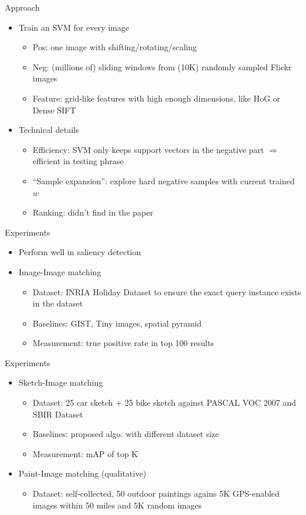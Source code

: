 \documentclass[12pt]{beamer}
\begin{document}
\begin{frame}{Approach}
	\begin{itemize}
		\item Train an SVM for every image
		\begin{itemize}
			\item Pos: one image with shifting/rotating/scaling
			\item Neg: (millions of) sliding windows from (10K) randomly sampled Flickr images
			\item Feature: grid-like features with high enough dimensions, like HoG or Dense SIFT
		\end{itemize}
		\item Technical details
		\begin{itemize}
			\item Efficiency: SVM only keeps support vectors in the negative part $\Rightarrow$ efficient in testing phrase
			\item ``Sample expansion'': explore hard negative samples with current trained $w$
			\item Ranking: didn't find in the paper
		\end{itemize}
	\end{itemize}
\end{frame}

\begin{frame}{Experiments}
	\begin{itemize}
		\item Perform well in saliency detection
		\item Image-Image matching
		\begin{itemize}
			\item Dataset: INRIA Holiday Dataset to ensure the exact query instance exists in the dataset
			\item Baselines: GIST, Tiny images, spatial pyramid
			\item Measurement: true positive rate in top 100 results
		\end{itemize}
	\end{itemize}
\end{frame}

\begin{frame}{Experiments}
	\begin{itemize}
		\item Sketch-Image matching
		\begin{itemize}
			\item Dataset: 25 car sketch + 25 bike sketch against PASCAL VOC 2007 and SBIR Dataset
			\item Baselines: proposed algo. with different dataset size
			\item Measurement: mAP of top K
		\end{itemize}
		\item Paint-Image matching (qualitative)
		\begin{itemize}
			\item Dataset: self-collected, 50 outdoor paintings agains 5K GPS-enabled images within 50 miles and 5K random images
		\end{itemize}
	\end{itemize}
\end{frame}
\end{document}
